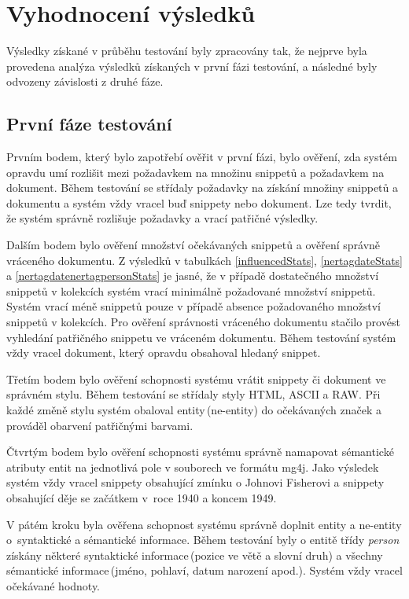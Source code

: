 \section{Vyhodnocení výsledků}

Výsledky získané v průběhu testování byly zpracovány tak, že nejprve byla provedena analýza výsledků získaných v první fázi testování, a následné byly odvozeny závislosti z druhé fáze.

\subsection{První fáze testování}
Prvním bodem, který bylo zapotřebí ověřit v první fázi, bylo ověření, zda systém opravdu umí rozlišit mezi požadavkem na množinu snippetů a požadavkem na dokument. Během testování se střídaly požadavky na získání množiny snippetů a dokumentu a systém vždy vracel buď snippety nebo dokument. Lze tedy tvrdit, že systém správně rozlišuje požadavky a vrací patřičné výsledky.

Dalším bodem bylo ověření množství očekávaných snippetů a ověření správně vráceného dokumentu.  Z výsledků v tabulkách \ref{influencedStats}, \ref{nertagdateStats} a  \ref{nertagdatenertagpersonStats}  je jasné, že v případě dostatečného množství snippetů v kolekcích systém vrací minimálně požadované množství snippetů. Systém vrací méně snippetů pouze v případě absence požadovaného množství snippetů v kolekcích. Pro ověření správnosti vráceného dokumentu stačilo provést vyhledání patřičného snippetu ve vráceném dokumentu. Během testování systém vždy vracel dokument, který opravdu obsahoval hledaný snippet.

Třetím bodem bylo ověření schopnosti systému vrátit snippety či dokument ve správném stylu. Během testování se střídaly styly HTML, ASCII a RAW. Při každé změně stylu systém obaloval entity\,(ne-entity) do očekávaných značek a prováděl obarvení patřičnými barvami.

Čtvrtým bodem bylo ověření schopnosti systému správně namapovat sémantické atributy entit na jednotlivá pole v souborech ve formátu mg4j. Jako výsledek systém vždy vracel snippety obsahující zmínku o Johnovi Fisherovi a snippety obsahující děje se začátkem v~roce 1940 a koncem 1949.

V pátém kroku byla ověřena schopnost systému správně doplnit entity a ne-entity o~syntaktické a sémantické informace. Během testování byly o entitě třídy \emph{person} získány některé syntaktické informace\,(pozice ve větě a slovní druh) a  všechny sémantické informace\,(jméno, pohlaví, datum narození apod.). Systém vždy vracel očekávané hodnoty.  


